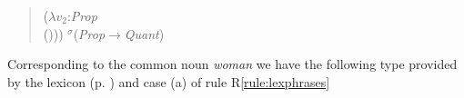 \begin{quote}
{{{{\hspace*{4em}($\lambda v_2$:\textit{Prop} \\
\hspace*{5em}()))
}{$^\sigma$(\textit{Prop}$\rightarrow$\textit{Quant})}}}}

\end{quote}

Corresponding to the common noun \textit{woman} we have the following
type provided by the lexicon (p. \pageref{pg:lexicon-cn}) and case (a) of rule
R\ref{rule:lexphrases}
